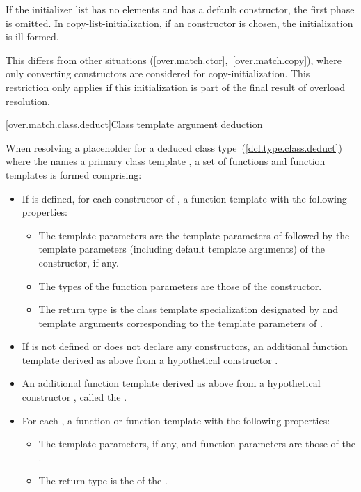 If the initializer list has no elements and  has a default constructor,
the first phase is omitted.
In copy-list-initialization, if an  constructor is
chosen, the initialization is ill-formed. \begin{note}
This differs from other situations (\ref{over.match.ctor},~\ref{over.match.copy}),
where only converting constructors are considered for copy-initialization.
This restriction only
applies if this initialization is part of the final result of overload
resolution. \end{note}

[over.match.class.deduct]{Class template argument deduction}%
%

\pnum
When resolving a placeholder for a deduced class type~(\ref{dcl.type.class.deduct})
where the  names a primary class template ,
a set of functions and function templates is formed comprising:
\begin{itemize}
\item
If  is defined,
for each constructor of ,
a function template with the following properties:
\begin{itemize}
\item
The template parameters are the template parameters of 
followed
by the template parameters (including default template arguments) of the constructor,
if any.
\item
The types of the function parameters are those of the constructor.
\item
The return type is the class template specialization
designated by 
and template arguments
corresponding to the template parameters of .
\end{itemize}

\item
If 
is not defined or does not declare any constructors,
an additional function template derived as above
from a hypothetical constructor .

\item
An additional function template derived as above
from a hypothetical constructor ,
called the .

\item
For each ,
a function or function template
with the following properties:

\begin{itemize}
\item
The template parameters, if any,
and function parameters
are those of the .
\item
The return type
is the 
of the .
\end{itemize}
\end{itemize}

